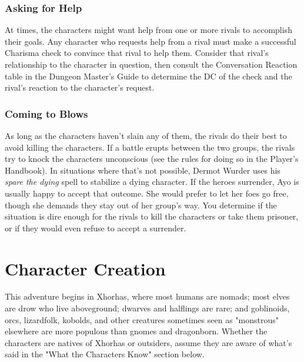 \documentclass[10pt,a4,twoside,twocolumn,openany,nodeprecatedcode]{dndbook}
\begin{document}
\subsubsection{Asking for Help}
At times, the characters might want help from one or more rivals to accomplish their goals. Any character who requests help from a rival must make a successful Charisma check to convince that rival to help them. Consider that rival's relationship to the character in question, then consult the Conversation Reaction table in the Dungeon Master's Guide to determine the DC of the check and the rival's reaction to the character's request.
\subsubsection{Coming to Blows}
As long as the characters haven't slain any of them, the rivals do their best to avoid killing the characters. If a battle erupts between the two groups, the rivals try to knock the characters unconscious (see the rules for doing so in the Player's Handbook). In situations where that's not possible, Dermot Wurder uses his \textit{spare the dying} spell to stabilize a dying character.
If the heroes surrender, Ayo is usually happy to accept that outcome. She would prefer to let her foes go free, though she demands they stay out of her group's way.
You determine if the situation is dire enough for the rivals to kill the characters or take them prisoner, or if they would even refuse to accept a surrender.
\section{Character Creation}
This adventure begins in Xhorhas, where most humans are nomads; most elves are drow who live aboveground; dwarves and halflings are rare; and goblinoids, orcs, lizardfolk, kobolds, and other creatures sometimes seen as "monstrous" elsewhere are more populous than gnomes and dragonborn. Whether the characters are natives of Xhorhas or outsiders, assume they are aware of what's said in the "What the Characters Know" section below.
\end{document}
